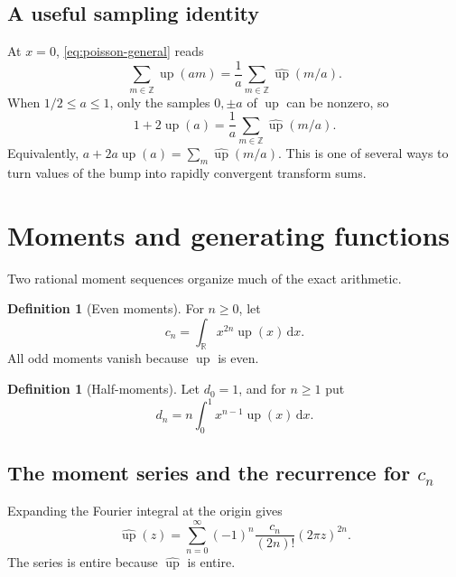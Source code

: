 \documentclass[11pt,oneside]{article}
\theoremstyle{definition}
\newtheorem{definition}[theorem]{Definition}
\theoremstyle{remark}
\newcommand{\upf}{\operatorname{up}}
\newcommand{\dd}{\,\mathrm d}
\newcommand{\Z}{\mathbb Z}
\newcommand{\R}{\mathbb R}
\newcommand{\Fourier}{\widehat{\upf}}
\begin{document}
\subsection{A useful sampling identity}

At $x=0$, \eqref{eq:poisson-general} reads
\begin{equation}\label{eq:poisson-at-zero}
  \sum_{m\in\Z}\upf(am)
  =\frac1a\sum_{m\in\Z}\Fourier(m/a).
\end{equation}
When $1/2\le a\le1$, only the samples $0,\pm a$ of $\upf$ can be nonzero, so
\begin{equation}\label{eq:sampling-a}
  1+2\upf(a)=\frac1a\sum_{m\in\Z}\Fourier(m/a).
\end{equation}
Equivalently,
$a+2a\upf(a)=\sum_m\Fourier(m/a)$.  This is one of several ways to turn values
of the bump into rapidly convergent transform sums.

\section{Moments and generating functions}\label{sec:moments}

Two rational moment sequences organize much of the exact arithmetic.

\begin{definition}[Even moments]\label{def:c-moments}
For $n\ge0$, let
\begin{equation}\label{eq:c-moment-def}
  c_n=\int_{\R}x^{2n}\upf(x)\dd x.
\end{equation}
All odd moments vanish because $\upf$ is even.
\end{definition}

\begin{definition}[Half-moments]\label{def:d-moments}
Let $d_0=1$, and for $n\ge1$ put
\begin{equation}\label{eq:d-half-moment-def}
  d_n=n\int_0^1x^{n-1}\upf(x)\dd x.
\end{equation}
\end{definition}

\subsection{The moment series and the recurrence for \texorpdfstring{$c_n$}{c n}}

Expanding the Fourier integral at the origin gives
\begin{equation}\label{eq:moment-series}
  \Fourier(z)=\sum_{n=0}^{\infty}(-1)^n
  \frac{c_n}{(2n)!}(2\pi z)^{2n}.
\end{equation}
The series is entire because $\Fourier$ is entire.
\end{document}
